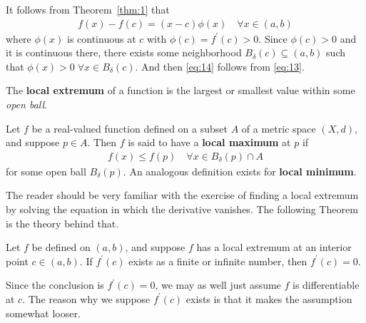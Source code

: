\documentclass[thmcnt=section, 12pt]{my-elegantbook}
\begin{document}
\begin{solution}
    It follows from Theorem~\ref{thm:1} that
    \begin{align}
        f(x) - f(c) = (x - c) \phi(x)
        \quad \forall x \in (a, b)
        \label{eq:13}
    \end{align}
    where $\phi(x)$ is continuous at $c$ with $\phi(c) = f^\prime(c) > 0$. Since $\phi(c) > 0$ and it is continuous there, there exists some neighborhood $B_\delta(c) \subseteq (a, b)$ such that $\phi(x) > 0 \; \forall x \in B_\delta(c)$. And then \eqref{eq:14} follows from \eqref{eq:13}.
\end{solution}


\par The \textbf{local extremum} of a function is the largest or smallest value within some \textit{open ball}.

\begin{definition}
    Let $f$ be a real-valued function defined on a subset $A$ of a metric space $(X, d)$, and suppose $p \in A$. Then $f$ is said to have a \textbf{local maximum} at $p$ if
    \begin{align*}
        f(x) \leq f(p)
        \quad \forall x \in B_\delta(p) \cap A
    \end{align*}
    for some open ball $B_\delta(p)$. An analogous definition exists for \textbf{local minimum}.
\end{definition}


\par The reader should be very familiar with the exercise of finding a local extremum by solving the equation in which the derivative vanishes. The following Theorem is the theory behind that.

\begin{theorem} \label{thm:5}
    Let $f$ be defined on $(a, b)$, and suppose $f$ has a local extremum at an interior point $c \in (a, b)$. If $f^\prime(c)$ exists as a finite or infinite number, then $f^\prime(c) = 0$.
\end{theorem}

\begin{remark}
    Since the conclusion is $f^\prime(c) = 0$, we may as well just assume $f$ is differentiable at $c$. The reason why we suppose $f^\prime(c)$ exists is that it makes the assumption somewhat looser.
\end{remark}
\end{document}
